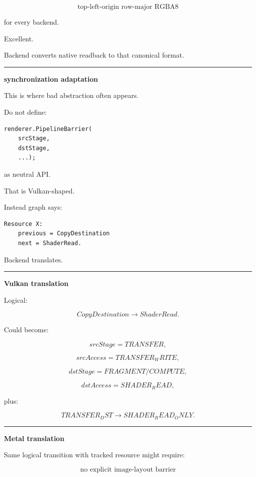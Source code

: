 \[
\boxed{
\text{top-left-origin row-major RGBA8}
}
\]

for every backend.

Excellent.

Backend converts native readback to that canonical format.

\begin{center}\rule{0.5\linewidth}{0.5pt}\end{center}

\textbf{synchronization adaptation}

This is where bad abstraction often appears.

Do not define:

\begin{verbatim}
renderer.PipelineBarrier(
    srcStage,
    dstStage,
    ...);
\end{verbatim}

as neutral API.

That is Vulkan-shaped.

Instead graph says:

\begin{verbatim}
Resource X:
    previous = CopyDestination
    next = ShaderRead.
\end{verbatim}

Backend translates.

\begin{center}\rule{0.5\linewidth}{0.5pt}\end{center}

\textbf{Vulkan translation}

Logical:

\[
CopyDestination
\rightarrow
ShaderRead.
\]

Could become:

\[
srcStage=TRANSFER,
\]

\[
srcAccess=TRANSFER_WRITE,
\]

\[
dstStage=FRAGMENT/COMPUTE,
\]

\[
dstAccess=SHADER_READ,
\]

plus:

\[
TRANSFER_DST
\rightarrow
SHADER_READ_ONLY.
\]

\begin{center}\rule{0.5\linewidth}{0.5pt}\end{center}

\textbf{Metal translation}

Same logical transition with tracked resource might require:

\[
\boxed{\text{no explicit image-layout barrier}}
\]

